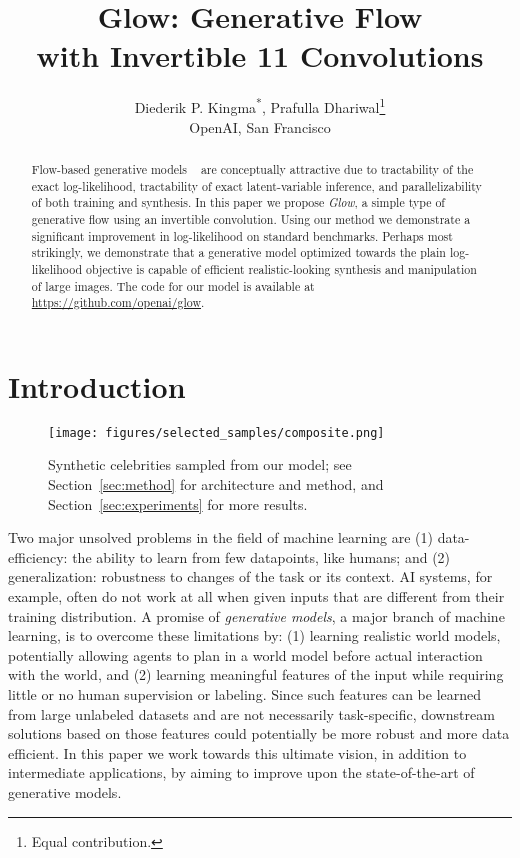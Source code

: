 \documentclass{article}
\title{
Glow: Generative Flow\\with Invertible 11 Convolutions
}
\author{Diederik P. Kingma\textsuperscript{*}, Prafulla Dhariwal\thanks{Equal contribution.}\\
OpenAI, San Francisco}
\begin{document}
\maketitle

\begin{abstract}
Flow-based generative models ~\citep{dinh2014nice} are conceptually attractive due to tractability of the exact log-likelihood, tractability of exact latent-variable inference, and parallelizability of both training and synthesis. In this paper we propose \emph{Glow}, a simple type of generative flow using an invertible  convolution. Using our method we demonstrate a significant improvement in log-likelihood on standard benchmarks. Perhaps most strikingly, we demonstrate that a generative model optimized towards the plain log-likelihood objective is capable of efficient realistic-looking synthesis and manipulation of large images. The code for our model is available at \url{https://github.com/openai/glow}.
\end{abstract}

\section{Introduction}

\begin{comment}
 - Put paper into context. Explain importance of generative modeling.
 - Explain likelihood-based generative models.
 - Explain (in words) what sets NICE/RealNVP type models apart from other likelihood-based models.
 - Summarize our contribution and its importance.
 - Add cool-looking figure of generated faces to lure the reader.
\end{comment}

\begin{figure}[!b]
	\centering
	\texttt{[image: figures/selected\_samples/composite.png]}
	\caption{Synthetic celebrities sampled from our model; see Section~\ref{sec:method} for architecture and method, and Section~\ref{sec:experiments} for more results.}
	\label{fig:xor}
\end{figure}

Two major unsolved problems in the field of machine learning are (1) data-efficiency: the ability to learn from few datapoints, like humans; and (2) generalization: robustness to changes of the task or its context. AI systems, for example, often do not work at all when given inputs that are different from their training distribution. A promise of \emph{generative models}, a major branch of machine learning, is to overcome these limitations by:
(1) learning realistic world models, potentially allowing agents to plan in a world model before actual interaction with the world, and (2) learning meaningful features of the input while requiring little or no human supervision or labeling. Since such features can be learned from large unlabeled datasets and are not necessarily task-specific, downstream solutions based on those features could potentially be more robust and more data efficient. In this paper we work towards this ultimate vision, in addition to intermediate applications, by aiming to improve upon the state-of-the-art of generative models.
\end{document}
